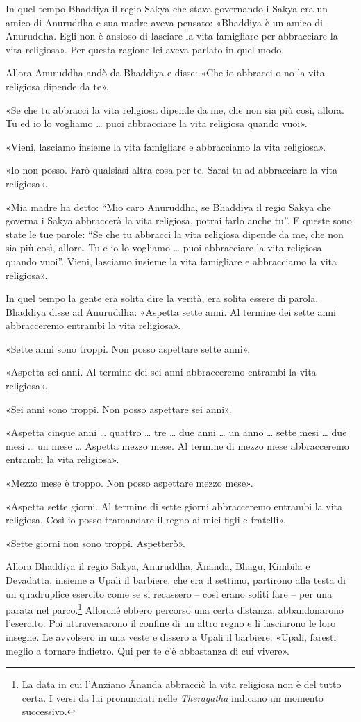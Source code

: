 In quel tempo Bhaddiya il regio Sakya che stava governando i Sakya era
un amico di Anuruddha e sua madre aveva pensato: «Bhaddiya è un amico di
Anuruddha. Egli non è ansioso di lasciare la vita famigliare per
abbracciare la vita religiosa». Per questa ragione lei aveva parlato in
quel modo.


Allora Anuruddha andò da Bhaddiya e disse: «Che io abbracci o no la vita
religiosa dipende da te».


«Se che tu abbracci la vita religiosa dipende da me, che non sia più
così, allora. Tu ed io lo vogliamo …​ puoi abbracciare la vita
religiosa quando vuoi».


«Vieni, lasciamo insieme la vita famigliare e abbracciamo la vita
religiosa».


«Io non posso. Farò qualsiasi altra cosa per te. Sarai tu ad abbracciare
la vita religiosa».


«Mia madre ha detto: “Mio caro Anuruddha, se Bhaddiya il regio Sakya che
governa i Sakya abbraccerà la vita religiosa, potrai farlo anche tu”. E
queste sono state le tue parole: “Se che tu abbracci la vita religiosa
dipende da me, che non sia più così, allora. Tu e io lo vogliamo …​
puoi abbracciare la vita religiosa quando vuoi”. Vieni, lasciamo insieme
la vita famigliare e abbracciamo la vita religiosa».


In quel tempo la gente era solita dire la verità, era solita essere di
parola. Bhaddiya disse ad Anuruddha: «Aspetta sette anni. Al termine dei
sette anni abbracceremo entrambi la vita religiosa».


«Sette anni sono troppi. Non posso aspettare sette anni».


«Aspetta sei anni. Al termine dei sei anni abbracceremo entrambi la vita
religiosa».


«Sei anni sono troppi. Non posso aspettare sei anni».


«Aspetta cinque anni …​ quattro …​ tre …​ due anni …​ un anno …​
sette mesi …​ due mesi …​ un mese …​ Aspetta mezzo mese. Al termine
di mezzo mese abbracceremo entrambi la vita religiosa».


«Mezzo mese è troppo. Non posso aspettare mezzo mese».


«Aspetta sette giorni. Al termine di sette giorni abbracceremo entrambi
la vita religiosa. Così io posso tramandare il regno ai miei figli e
fratelli».


«Sette giorni non sono troppi. Aspetterò».


Allora Bhaddiya il regio Sakya, Anuruddha, Ānanda, Bhagu, Kimbila e
Devadatta, insieme a Upāli il barbiere, che era il settimo, partirono
alla testa di un quadruplice esercito come se si recassero – così erano
soliti fare – per una parata nel parco.\footnote{La data in cui l’Anziano Ānanda abbracciò la vita religiosa non è del tutto certa. I versi da lui pronunciati nelle \emph{Theragāthā} indicano un momento successivo.} Allorché ebbero
percorso una certa distanza, abbandonarono l’esercito. Poi
attraversarono il confine di un altro regno e lì lasciarono le loro
insegne. Le avvolsero in una veste e dissero a Upāli il barbiere:
«Upāli, faresti meglio a tornare indietro. Qui per te c’è abbastanza di
cui vivere».


